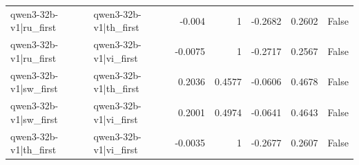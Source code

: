 \begin{table}
\begin{tabular}{l l r r r r l}
qwen3-32b-v1|ru_first & qwen3-32b-v1|th_first & -0.004 & 1 & -0.2682 & 0.2602 & False \\
qwen3-32b-v1|ru_first & qwen3-32b-v1|vi_first & -0.0075 & 1 & -0.2717 & 0.2567 & False \\
qwen3-32b-v1|sw_first & qwen3-32b-v1|th_first & 0.2036 & 0.4577 & -0.0606 & 0.4678 & False \\
qwen3-32b-v1|sw_first & qwen3-32b-v1|vi_first & 0.2001 & 0.4974 & -0.0641 & 0.4643 & False \\
qwen3-32b-v1|th_first & qwen3-32b-v1|vi_first & -0.0035 & 1 & -0.2677 & 0.2607 & False \\
\bottomrule
\end{tabular}
\end{table}
